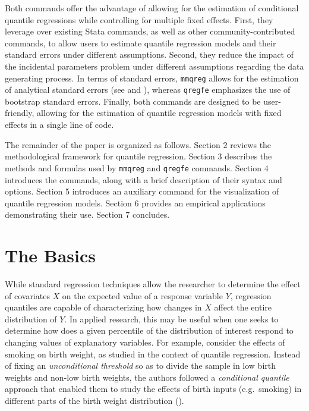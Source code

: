 \documentclass[bib]{statapress}
\begin{document}
Both commands offer the advantage of allowing for the estimation of
conditional quantile regressions while controlling for multiple fixed
effects. First, they leverage over existing Stata commands, as well as
other community-contributed commands, to allow users to estimate
quantile regression models and their standard errors under different
assumptions. Second, they reduce the impact of the incidental parameters
problem under different assumptions regarding the data generating
process. In terms of standard errors, \texttt{mmqreg} allows for the
estimation of analytical standard errors (see \citet{mss2019} and
\citet{riosavila2024}), whereas \texttt{qregfe} emphasizes the use of
bootstrap standard errors. Finally, both commands are designed to be
user-friendly, allowing for the estimation of quantile regression models
with fixed effects in a single line of code.

The remainder of the paper is organized as follows. Section 2 reviews
the methodological framework for quantile regression. Section 3
describes the methods and formulas used by \texttt{mmqreg} and
\texttt{qregfe} commands. Section 4 introduces the commands, along with
a brief description of their syntax and options. Section 5 introduces an
auxiliary command for the visualization of quantile regression models.
Section 6 provides an empirical applications demonstrating their use.
Section 7 concludes.

\section{The Basics}\label{sec-basics}

While standard regression techniques allow the researcher to determine
the effect of covariates \(X\) on the expected value of a response
variable \(Y\), regression quantiles are capable of characterizing how
changes in \(X\) affect the entire distribution of \(Y\). In applied
research, this may be useful when one seeks to determine how does a
given percentile of the distribution of interest respond to changing
values of explanatory variables. For example, consider the effects of
smoking on birth weight, as \citep{abrevaya2008} studied in the context
of quantile regression. Instead of fixing an \emph{unconditional
threshold} so as to divide the sample in low birth weights and non-low
birth weights, the authors followed a \emph{conditional quantile}
approach that enabled them to study the effects of birth inputs
(e.g.~smoking) in different parts of the birth weight distribution
(\citep{abrevaya2008}).
\end{document}
